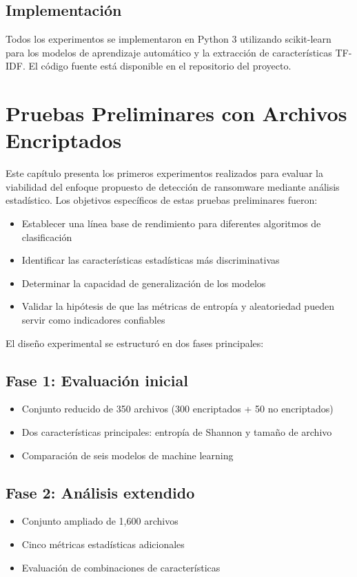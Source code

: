 \subsection{Implementación}

Todos los experimentos se implementaron en Python 3 utilizando scikit-learn~\cite{sklearn} para los modelos de aprendizaje automático y la extracción de características TF-IDF. El código fuente está disponible en el repositorio del proyecto.

\section{Pruebas Preliminares con Archivos Encriptados}
\label{sec:pruebas_preliminares}

Este capítulo presenta los primeros experimentos realizados para evaluar la viabilidad del enfoque propuesto de detección de ransomware mediante análisis estadístico. Los objetivos específicos de estas pruebas preliminares fueron:

\begin{itemize}
    \item Establecer una línea base de rendimiento para diferentes algoritmos de clasificación
    \item Identificar las características estadísticas más discriminativas
    \item Determinar la capacidad de generalización de los modelos
    \item Validar la hipótesis de que las métricas de entropía y aleatoriedad pueden servir como indicadores confiables
\end{itemize}

El diseño experimental se estructuró en dos fases principales:

\subsection{Fase 1: Evaluación inicial}
\begin{itemize}
    \item Conjunto reducido de 350 archivos (300 encriptados + 50 no encriptados)
    \item Dos características principales: entropía de Shannon y tamaño de archivo
    \item Comparación de seis modelos de machine learning
\end{itemize}

\subsection{Fase 2: Análisis extendido}
\begin{itemize}
    \item Conjunto ampliado de 1,600 archivos
    \item Cinco métricas estadísticas adicionales
    \item Evaluación de combinaciones de características
\end{itemize}

